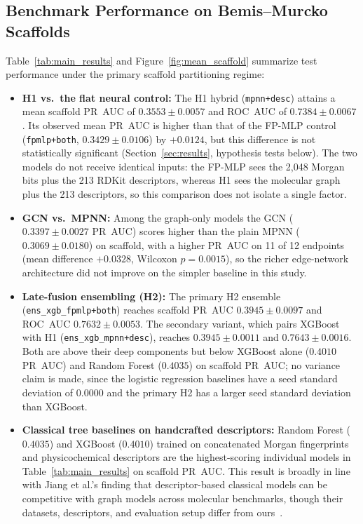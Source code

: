 \subsection{Benchmark Performance on Bemis--Murcko Scaffolds}
Table~\ref{tab:main_results} and Figure~\ref{fig:mean_scaffold} summarize test performance under the primary scaffold partitioning regime:
\begin{itemize}
    \item \textbf{H1 vs.\ the flat neural control:} The H1 hybrid (\texttt{mpnn+desc}) attains a mean scaffold PR~AUC of $0.3553 \pm 0.0057$ and ROC~AUC of $0.7384 \pm 0.0067$. Its observed mean PR~AUC is higher than that of the FP-MLP control (\texttt{fpmlp+both}, $0.3429 \pm 0.0106$) by $+0.0124$, but this difference is not statistically significant (Section~\ref{sec:results}, hypothesis tests below). The two models do not receive identical inputs: the FP-MLP sees the 2,048 Morgan bits plus the 213 RDKit descriptors, whereas H1 sees the molecular graph plus the 213 descriptors, so this comparison does not isolate a single factor.
    \item \textbf{GCN vs.\ MPNN:} Among the graph-only models the GCN ($0.3397 \pm 0.0027$ PR~AUC) scores higher than the plain MPNN ($0.3069 \pm 0.0180$) on scaffold, with a higher PR~AUC on 11 of 12 endpoints (mean difference $+0.0328$, Wilcoxon $p = 0.0015$), so the richer edge-network architecture did not improve on the simpler baseline in this study.
    \item \textbf{Late-fusion ensembling (H2):} The primary H2 ensemble (\texttt{ens\_xgb\_fpmlp+both}) reaches scaffold PR~AUC $0.3945 \pm 0.0097$ and ROC~AUC $0.7632 \pm 0.0053$. The secondary variant, which pairs XGBoost with H1 (\texttt{ens\_xgb\_mpnn+desc}), reaches $0.3945 \pm 0.0011$ and $0.7643 \pm 0.0016$. Both are above their deep components but below XGBoost alone ($0.4010$ PR~AUC) and Random Forest ($0.4035$) on scaffold PR~AUC; no variance claim is made, since the logistic regression baselines have a seed standard deviation of $0.0000$ and the primary H2 has a larger seed standard deviation than XGBoost.
    \item \textbf{Classical tree baselines on handcrafted descriptors:} Random Forest ($0.4035$) and XGBoost ($0.4010$) trained on concatenated Morgan fingerprints and physicochemical descriptors are the highest-scoring individual models in Table~\ref{tab:main_results} on scaffold PR~AUC. This result is broadly in line with Jiang et al.'s finding that descriptor-based classical models can be competitive with graph models across molecular benchmarks, though their datasets, descriptors, and evaluation setup differ from ours~\cite{jiang2021could}.
\end{itemize}


